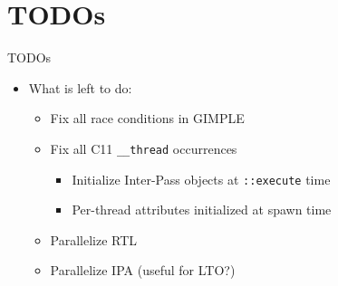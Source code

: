 \section{TODOs}

\begin{frame}{TODOs}
    \begin{itemize}
        \item What is left to do:
            \begin{itemize}
                \item Fix all race conditions in GIMPLE
                \item Fix all C11 \texttt{\_\_thread} occurrences
                    \begin{itemize}
                        \item Initialize Inter-Pass objects at \texttt{::execute} time
                        \item Per-thread attributes initialized at spawn time
                    \end{itemize}
                \item Parallelize RTL
                \item Parallelize IPA (useful for LTO?)
            \end{itemize}
    \end{itemize}
\end{frame}

